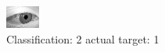 \begin{figure}[h!]
\begin{center}
\includegraphics[width=0.60\columnwidth]{figures/ID2748_class_2_target_1.png}
\end{center}
\caption{ Classification: 2 actual target: 1}
\label{fig:ID2748_class_2_target_1}
\end{figure}
